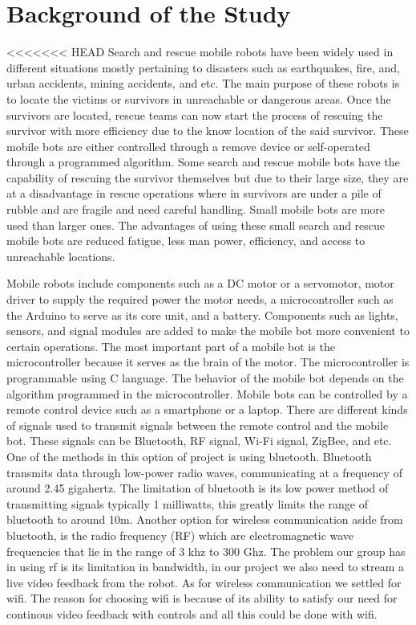 \section{Background of the Study}
<<<<<<< HEAD
 Search and rescue mobile robots have been widely used in different situations mostly pertaining to disasters such as earthquakes, fire, and, urban accidents, mining accidents, and etc. The main purpose of these robots is to locate the victims or survivors in unreachable or dangerous areas. Once the survivors are located, rescue teams can now start the process of rescuing the survivor with more efficiency due to the know location of the said survivor. These mobile bots are either controlled through a remove device or self-operated through a programmed algorithm.  Some search and rescue mobile bots have the capability of rescuing the survivor themselves but due to their large size, they are at a disadvantage in rescue operations where in survivors are under a pile of rubble and are fragile and need careful handling. Small mobile bots are more used than larger ones. The advantages of using these small search and rescue mobile bots are reduced fatigue, less man power, efficiency, and access to unreachable locations. 
 \par \indent
 Mobile robots include components such as a DC motor or a servomotor, motor driver to supply the required power the motor needs, a microcontroller such as the Arduino to serve as its core unit, and a battery. Components such as lights, sensors, and signal modules are added to make the mobile bot more convenient to certain operations. The most important part of a mobile bot is the microcontroller because it serves as the brain of the motor. The microcontroller is programmable using C language. The behavior of the mobile bot depends on the algorithm programmed in the microcontroller. Mobile bots can be controlled by a remote control device such as a smartphone or a laptop. There are different kinds of signals used to transmit signals between the remote control and the mobile bot. These signals can be Bluetooth, RF signal, Wi-Fi signal, ZigBee, and etc. One of the methods in this option of project is using bluetooth. Bluetooth transmits data through low-power radio waves, communicating at a frequency of around 2.45 gigahertz. The limitation of bluetooth is its low power method of transmitting signals typically 1 milliwatts, this greatly limits the range of bluetooth to around 10m. Another option for wireless communication aside from bluetooth, is the radio frequency (RF) which are electromagnetic wave frequencies that lie in the range of 3 khz to 300 Ghz. The problem our group has in using rf is its limitation in bandwidth, in our project we also need to stream a live video feedback from the robot. As for wireless communication we settled for wifi. The reason for choosing wifi is because of its ability to satisfy our need for continous video feedback with controls and all this could be done with wifi. 


